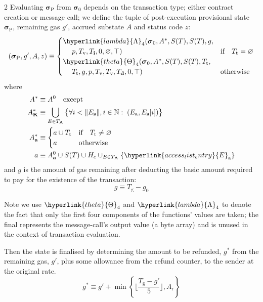 \documentclass[9pt,oneside]{amsart}
\begin{document}
\begin{multicols}{2}
Evaluating $\boldsymbol{\sigma}_{\mathrm{P}}$ from $\boldsymbol{\sigma}_0$ depends on the transaction type; either contract creation or message call; we define the tuple of post-execution provisional state $\boldsymbol{\sigma}_{\mathrm{P}}$, remaining gas $g'$, accrued substate $A$ and status code $z$:
\begin{equation}
(\boldsymbol{\sigma}_{\mathrm{P}}, g', A, z) \equiv \begin{cases}
\hyperlink{lambda}{\Lambda}_{4}(\boldsymbol{\sigma}_0, A^*, S(T), S(T), g, &\\ \quad\; p, T_{\mathrm{v}}, T_{\mathbf{i}}, 0, \varnothing, \top) & \text{if} \quad T_{\mathrm{t}} = \varnothing \\
\hyperlink{theta}{\Theta}_{4}(\boldsymbol{\sigma}_0, A^*, S(T), S(T), T_{\mathrm{t}}, &\\ \quad\; T_{\mathrm{t}}, g, p, T_{\mathrm{v}}, T_{\mathrm{v}}, T_{\mathbf{d}}, 0, \top) & \text{otherwise}
\end{cases}
\end{equation}
where
\begin{align}
A^* & \equiv A^0 \quad \text{except} \\
A^*_{\mathbf{K}} & \equiv \bigcup_{E \in T_{\mathbf{A}}} \big\{ \forall i < \lVert E_{\mathbf{s}} \rVert, i \in \mathbb{N}: \; (E_{\mathrm{a}}, E_{\mathbf{s}}[i]) \big\} \\
A^*_{\mathbf{a}} & \equiv \begin{cases}
a \cup T_{\mathrm{t}} & \text{if} \quad T_{\mathrm{t}} \neq \varnothing \\
a & \text{otherwise}
\end{cases} \\
a & \equiv A^0_{\mathbf{a}} \cup S(T) \cup H_c \cup_{E \in T_{\mathbf{A}}} \{ \hyperlink{access_list_entry}{E}_{\mathrm{a}} \}
\end{align}
and $g$ is the amount of gas remaining after deducting the basic amount required to pay for the existence of the transaction:
\begin{equation}
g \equiv T_{\mathrm{g}} - g_0
\end{equation}

Note we use $\hyperlink{theta}{\Theta}_{4}$ and $\hyperlink{lambda}{\Lambda}_{4}$ to denote the fact that only the first four components of the functions' values are taken; the final represents the message-call's output value (a byte array) and is unused in the context of transaction evaluation.

Then the state is finalised by determining the amount to be refunded, $g^*$ from the remaining gas, $g'$, plus some allowance from the refund counter, to the sender at the original rate.
\begin{equation}
g^* \equiv g' + \min \left\{ \Big\lfloor \dfrac{T_{\mathrm{g}} - g'}{5} \Big\rfloor, A_{\mathrm{r}} \right\}
\end{equation}


\end{multicols}
\end{document}
